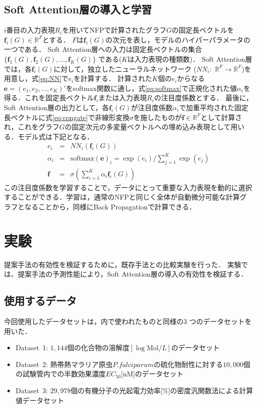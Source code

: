 \documentclass[twocolumn]{jarticle}
\begin{document}
\subsection{Soft Attention層の導入と学習}
$i$番目の入力表現$R_i$を用いてNFPで計算されたグラフ$G$の固定長ベクトルを$\bm{f}_i(G) \in \mathbb{R}^F$とする．
$F$は$\bm{f}_i(G)$の次元を表し，モデルのハイパーパラメータの一つである．
Soft Attention層への入力は固定長ベクトルの集合 $ \{\bm{f}_1(G),\bm{f}_2(G),\dots,\bm{f}_K(G)\}$ である($K$は入力表現の種類数)．
Soft Attention層では，各$\bm{f}_i(G)$に対して，独立したニューラルネットワーク ($NN_i:$ $\mathbb{R}^F \to \mathbb{R}^F$)を用意し，式\eqref{eq:NN}で$e_i$を計算する．
計算された$K$個の$e_i$からなる$\bm{e}=(e_1, e_2,\dots,e_K)'$をsoftmax関数に通し，式\eqref{eq:softmax}で正規化された値$\alpha_i$を得る．これを固定長ベクトル$\bm{f}_i$または入力表現$R_i$の注目度係数とする．
最後に，Soft Attention層の出力として，各$\bm{f}_i(G)$が注目度係数$\alpha_i$で加重平均された固定長ベクトルに式\eqref{eq:congate}で非線形変換$\sigma$を施したものが$\bm{f} \in \mathbb{R}^F$として計算され，これをグラフ$G$の固定次元の多変量ベクトルへの埋め込み表現として用いる．モデル式は下記となる．
\begin{eqnarray}
	\label{eq:NN}
	e_i &=& NN_i(\bm{f}_i(G)) \\
	\label{eq:softmax}
	\alpha_i &=& \textstyle\mathrm{softmax}(\bm{e})_i = {\exp(e_i)}/{\sum_{j=1}^{K}\exp(e_j)} \\
	\label{eq:congate}
	\bm{f}&=& \textstyle\sigma(\sum_{i = 1}^{K} \alpha_i \bm{f}_i(G))
\end{eqnarray}
この注目度係数を学習することで，データにとって重要な入力表現を動的に選択することができる．学習は，通常のNFPと同じく全体が自動微分可能な計算グラフとなることから，同様にBack Propagationで計算できる．

\vspace{-10pt}
\section{実験}
提案手法の有効性を検証するために，既存手法との比較実験を行った．
実験では、提案手法の予測性能により，Soft Attention層の導入の有効性を検証する．

\vspace{-6pt}
\subsection{使用するデータ}
今回使用したデータセットは，\cite{NNFP}内で使われたものと同様の3 つのデータセットを用いた．
\begin{itemize}
\setlength{\itemsep}{0pt}
\item Dataset~1: $1,144$個の化合物の溶解度$[\log{\mathrm{Mol}/L}]$のデータセット\cite{delaney}
\item Dataset~2: 熱帯熱マラリア原虫\(P.falciparum\)の硫化物耐性に対する$10,000$個の試験管内での半数効果濃度$EC_{50}$[nM]のデータセット\cite{malaria}
\item Dataset~3: $29,978$個の有機分子の光起電力効率[\%]の密度汎関数法による計算値データセット\cite{cep}
\end{itemize}
\end{document}
